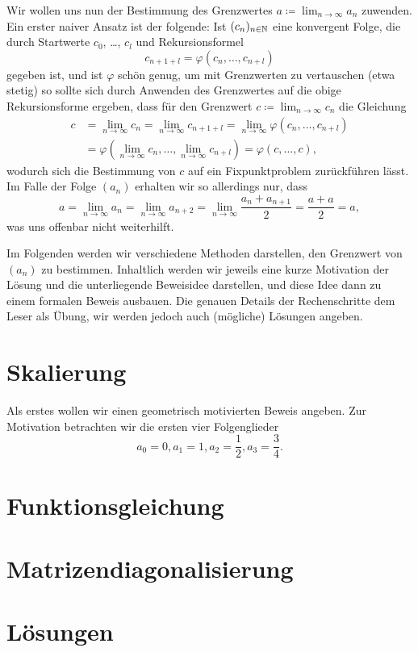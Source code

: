 \documentclass[a4paper,10pt]{article}
\begin{document}
Wir wollen uns nun der Bestimmung des Grenzwertes $a \coloneqq \lim_{n \to \infty} a_n$ zuwenden. Ein erster naiver Ansatz ist der folgende: Ist $(c_n)_{n \in \mathbb{N}}$ eine konvergent Folge, die durch Startwerte $c_0$, \dots, $c_l$ und Rekursionsformel
\[
 c_{n+1+l} = \varphi(c_n, \dotsc, c_{n+l})
\]
gegeben ist, und ist $\varphi$ schön genug, um mit Grenzwerten zu vertauschen (etwa stetig) so sollte sich durch Anwenden des Grenzwertes auf die obige Rekursionsforme ergeben, dass für den Grenzwert $c \coloneqq \lim_{n \to \infty} c_n$ die Gleichung
\begin{align*}
 c
 &= \lim_{n \to \infty} c_n
 = \lim_{n \to \infty} c_{n+1+l}
 = \lim_{n \to \infty} \varphi(c_n, \dotsc, c_{n+l}) \\
 &= \varphi\left(\lim_{n \to \infty} c_n, \dotsc, \lim_{n \to \infty} c_{n+l}\right)
 = \varphi(c, \dotsc, c),
\end{align*}
wodurch sich die Bestimmung von $c$ auf ein Fixpunktproblem zurückführen lässt. Im Falle der Folge $(a_n)$ erhalten wir so allerdings nur, dass
\[
 a
 = \lim_{n \to \infty} a_n
 = \lim_{n \to \infty} a_{n+2}
 = \lim_{n \to \infty} \frac{a_n + a_{n+1}}{2}
 = \frac{a + a}{2}
 = a,
\]
was uns offenbar nicht weiterhilft.


Im Folgenden werden wir verschiedene Methoden darstellen, den Grenzwert von $(a_n)$ zu bestimmen. Inhaltlich werden wir jeweils eine kurze Motivation der Lösung und die unterliegende Beweisidee darstellen, und diese Idee dann zu einem formalen Beweis ausbauen. Die genauen Details der Rechenschritte dem Leser als Übung, wir werden jedoch auch (mögliche) Lösungen angeben.





\section{Skalierung}
Als erstes wollen wir einen geometrisch motivierten Beweis angeben. Zur Motivation betrachten wir die ersten vier Folgenglieder
\[
 a_0 = 0, a_1 = 1, a_2 = \frac{1}{2}, a_3 = \frac{3}{4}.
\]


\section{Funktionsgleichung}


\section{Matrizendiagonalisierung}












\section{Lösungen}
\end{document}
